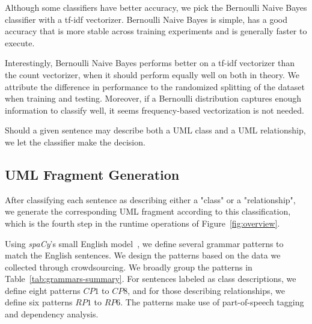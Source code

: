 \documentclass[sigconf]{acmart}
\begin{document}
Although some classifiers have better accuracy, we pick the Bernoulli Naive Bayes classifier with a tf-idf vectorizer. Bernoulli Naive Bayes is simple, has a good accuracy that is more stable across training experiments and is generally faster to execute.

Interestingly, Bernoulli Naive Bayes performs better on a tf-idf vectorizer than the count vectorizer, when it should perform equally well on both in theory. We attribute the difference in performance to the randomized splitting of the dataset when training and testing. Moreover, if a Bernoulli distribution captures enough information to classify well, it seems frequency-based vectorization is not needed.

Should a given sentence may describe both a UML class and a UML relationship, we let the classifier make the decision.

\subsection{UML Fragment Generation} \label{sec:generation}
After classifying each sentence as describing either a "class" or a "relationship", we generate the corresponding UML fragment according to this classification, which is the fourth step in the runtime operations of Figure~\ref{fig:overview}.

Using \textit{spaCy}'s small English model~\cite{spacy}, we define several grammar patterns to match the English sentences. We design the patterns based on the data we collected through crowdsourcing. We broadly group the patterns in Table~\ref{tab:grammars-summary}. For sentences labeled as class descriptions, we define eight patterns $CP1$ to $CP8$, and for those describing relationships, we define six patterns $RP1$ to $RP6$. The patterns make use of part-of-speech tagging and dependency analysis.
\end{document}
